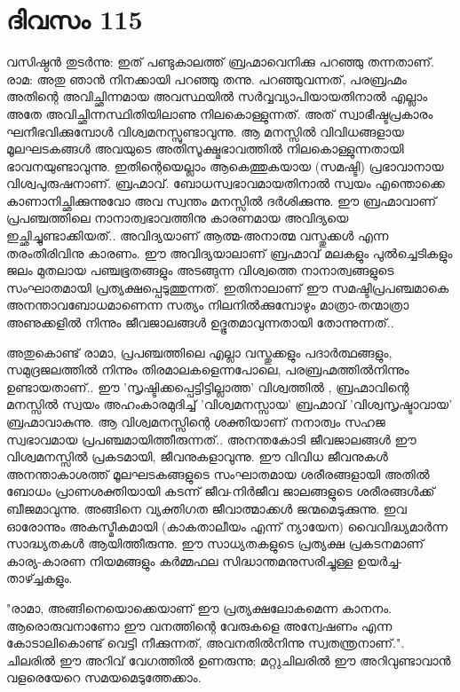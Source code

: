 \newpage
\section{ദിവസം 115}


വസിഷ്ഠന്‍ തുടര്‍ന്നു: ഇത്‌ പണ്ടുകാലത്ത്‌ ബ്രഹ്മാവെനിക്കു പറഞ്ഞു തന്നതാണ്‌. രാമ: അതു ഞാന്‍ നിനക്കായി പറഞ്ഞു തന്നു. പറഞ്ഞുവന്നത്,  പരബ്രഹ്മം അതിന്റെ അവിച്ഛിന്നമായ അവസ്ഥയില്‍ സര്‍വ്വവ്യാപിയായതിനാല്‍ എല്ലാം അതേ അവിച്ഛിന്നസ്ഥിതിയിലാണു നിലകൊള്ളുന്നത്‌. അത്‌ സ്വാഭീഷ്ടപ്രകാരം ഘനീഭവിക്കുമ്പോള്‍ വിശ്വമനസ്സുണ്ടാവുന്നു. ആ മനസ്സില്‍ വിവിധങ്ങളായ മൂലഘടകങ്ങള്‍ അവയുടെ അതിസൂക്ഷ്മഭാവത്തില്‍ നിലകൊള്ളുന്നതായി ഭാവനയുണ്ടാവുന്നു. ഇതിന്റെയെല്ലാം ആകെത്തുകയായ (സമഷ്ടി) പ്രഭാവാനായ വിശ്വപുരുഷനാണ്‌. ബ്രഹ്മാവ്‌. ബോധസ്വഭാവമായതിനാല്‍ സ്വയം എന്തൊക്കെ കാണാനിച്ഛിക്കുന്നുവോ അവ സ്വന്തം മനസ്സില്‍ ദര്‍ശിക്കുന്നു. ഈ ബ്രഹ്മാവാണ്‌ പ്രപഞ്ചത്തിലെ നാനാത്വഭാവത്തിനു കാരണമായ അവിദ്യയെ ഇച്ഛിച്ചുണ്ടാക്കിയത്‌.. അവിദ്യയാണ്‌ ആത്മ-അനാത്മ വസ്തുക്കള്‍ എന്ന തരംതിരിവിനു കാരണം. ഈ അവിദ്യയാലാണ്‌ ബ്രഹ്മാവ്‌ മലകളും പുല്‍ച്ചെടികളും ജലം മുതലായ പഞ്ചഭൂതങ്ങളും അടങ്ങുന്ന വിശ്വത്തെ നാനാത്വങ്ങളുടെ സംഘാതമായി പ്രത്യക്ഷപ്പെടുത്തുന്നത്‌. ഇതിനാലാണ്‌ ഈ സമഷ്ടിപ്രപഞ്ചമാകെ അനന്താവബോധമാണെന്ന സത്യം നിലനില്‍ക്കുമ്പോഴും മാത്രാ-തന്മാത്രാ അണുക്കളില്‍ നിന്നും ജീവജാലങ്ങള്‍ ഉദ്ഭൂതമാവുന്നതായി തോന്നുന്നത്‌..

അതുകൊണ്ട്‌ രാമാ, പ്രപഞ്ചത്തിലെ എല്ലാ വസ്തുക്കളും പദാര്‍ത്ഥങ്ങളും, സമുദ്രജലത്തില്‍ നിന്നും തിരമാലകളെന്നപോലെ, പരബ്രഹ്മത്തില്‍നിന്നും ഉണ്ടായതാണ്‌.. ഈ 'സൃഷ്ടിക്കപ്പെട്ടിട്ടില്ലാത്ത' വിശ്വത്തില്‍ , ബ്രഹ്മാവിന്റെ മനസ്സില്‍ സ്വയം അഹംകാരമുദിച്ച്‌ 'വിശ്വമനസ്സായ' ബ്രഹ്മാവ്‌ 'വിശ്വസൃഷ്ടാവായ' ബ്രഹ്മാവാകുന്നു. ആ വിശ്വമനസ്സിന്റെ ശക്തിയാണ്‌ നനാത്വം സഹജ സ്വഭാവമായ പ്രപഞ്ചമായിത്തീരുന്നത്‌.. അനന്തകോടി ജീവജാലങ്ങള്‍ ഈ വിശ്വമനസ്സില്‍ പ്രകടമായി, ജീവനുകളാവുന്നു. ഈ വിവിധ ജീവനുകള്‍ അനന്താകാശത്ത്‌ മൂലഘടകങ്ങളുടെ സംഘാതമായ ശരീരങ്ങളായി അതില്‍ ബോധം പ്രാണശക്തിയായി കടന്ന് ജീവ-നിര്‍ജീവ ജാലങ്ങളുടെ ശരീരങ്ങള്‍ക്ക്‌ ബീജമാവുന്നു. അങ്ങിനെ വ്യക്തിഗത ജീവാത്മാക്കള്‍ ജന്മമെടുക്കുന്നു. ഇവ ഓരോന്നും അകസ്മീകമായി (കാകതാലീയം എന്ന് ന്യായേന) വൈവിദ്ധ്യമാര്‍ന്ന സാദ്ധ്യതകള്‍ ആയിത്തീരുന്നു. ഈ സാധ്യതകളുടെ പ്രത്യക്ഷ പ്രകടനമാണ്‌ കാര്യ-കാരണ നിയമങ്ങളും കര്‍മ്മഫല സിദ്ധാന്തമനുസരിച്ചുള്ള ഉയര്‍ച്ച-താഴ്ച്ചകളും.

"രാമാ, അങ്ങിനെയൊക്കെയാണ്‌ ഈ പ്രത്യക്ഷലോകമെന്ന കാനനം. ആരൊരുവനാണോ ഈ വനത്തിന്റെ വേരുകളെ അന്വേഷണം എന്ന കോടാലികൊണ്ട്‌ വെട്ടി നീക്കുന്നത്‌, അവനതില്‍നിന്നു സ്വതന്ത്രനാണ്‌.". ചിലരില്‍ ഈ അറിവ്‌ വേഗത്തില്‍ ഉണരുന്നു; മറ്റുചിലരില്‍ ഈ അറിവുണ്ടാവാന്‍ വളരെയേറെ സമയമെടുത്തേക്കാം. 
